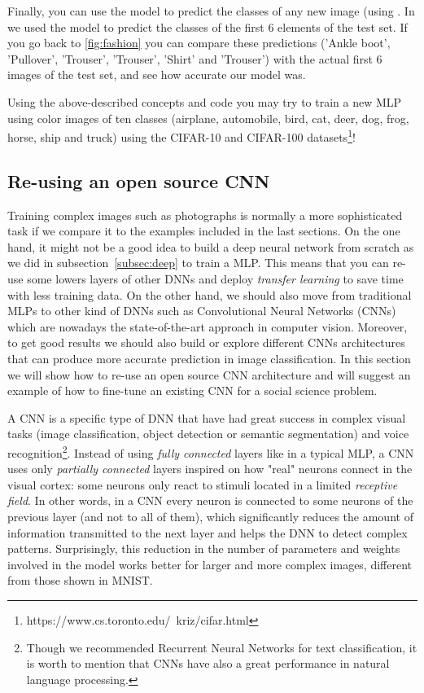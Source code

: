 
Finally, you can use the model to predict the classes of any new image (using . In  we used the model to predict the classes of the first 6 elements of the test set. If you go back to \ref{fig:fashion} you can compare these predictions ('Ankle boot', 'Pullover', 'Trouser', 'Trouser', 'Shirt' and 'Trouser') with the actual first 6 images of the test set, and see how accurate our model was.


Using the above-described concepts and code you may try to train a new MLP using color images of ten classes (airplane, automobile, bird, cat, deer, dog, frog, horse, ship and truck) using the CIFAR-10 and CIFAR-100 datasets\footnote{https://www.cs.toronto.edu/~kriz/cifar.html}!


\subsection{Re-using an open source CNN}
\label{subsec:tuning}

Training complex images such as photographs is normally a more sophisticated task if we compare it to the examples included in the last sections. On the one hand, it might not be a good idea to build a deep neural network from scratch as we did in subsection~\ref{subsec:deep} to train a MLP. This means that you can re-use some lowers layers of other DNNs and deploy \textit{transfer learning} to save time with less training data. On the other hand, we should also move from traditional MLPs to other kind of DNNs such as Convolutional Neural Networks (CNNs) which are  nowadays the state-of-the-art approach in computer vision. Moreover, to get good results we should also build or explore different CNNs architectures that can produce more accurate prediction in image classification.  In this section we will show how to re-use an open source CNN architecture and will suggest an example of how to fine-tune an existing CNN for a social science problem.

A CNN is a specific type of DNN that have had great success in complex visual tasks (image classification, object detection or semantic segmentation) and voice recognition\footnote{Though we recommended Recurrent Neural Networks for text classification, it is worth to mention that CNNs have also a great performance in natural language processing.}. Instead of using \textit{fully connected} layers like in a typical MLP, a CNN uses only \textit{partially connected} layers inspired on how "real" neurons connect in the visual cortex: some neurons only react to stimuli located in a limited \textit{receptive field}. In other words, in a CNN every neuron is connected to some neurons of the previous layer (and not to all of them), which significantly reduces the amount of information transmitted to the next layer and helps the DNN to detect complex patterns. Surprisingly, this reduction in the number of parameters and weights involved in the model works better for larger and more complex images, different from those shown in MNIST.

